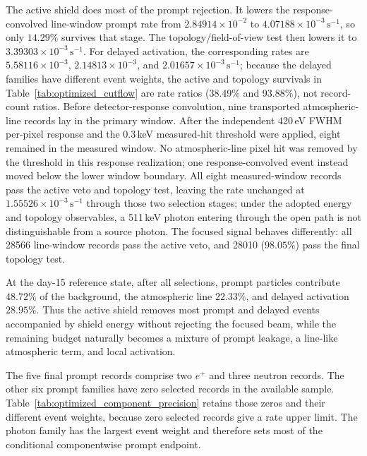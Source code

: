\documentclass[11pt]{article}
\newcommand{\cps}{\ensuremath{\,\mathrm{s^{-1}}}}
\begin{document}
The active shield does most of the prompt rejection. It lowers the response-convolved
line-window prompt rate from $2.84914\times10^{-2}$ to
$4.07188\times10^{-3}\cps$, so only $14.29\%$ survives that stage. The topology/field-of-view test then lowers
it to $3.39303\times10^{-3}\cps$. For delayed activation, the corresponding
rates are $5.58116\times10^{-3}$, $2.14813\times10^{-3}$, and
$2.01657\times10^{-3}\cps$; because the delayed families have different event
weights, the active and topology survivals in Table~\ref{tab:optimized_cutflow}
are rate ratios (38.49\% and 93.88\%), not record-count ratios. Before detector-response
convolution, nine transported atmospheric-line records lay in the primary window.
After the independent 420\,eV FWHM per-pixel response and the 0.3\,keV measured-hit
threshold were applied, eight remained in the measured window. No atmospheric-line
pixel hit was removed by the threshold in this response realization; one
response-convolved event instead moved below the lower window boundary.
All eight measured-window records pass the active veto and topology test, leaving
the rate unchanged at $1.55526\times10^{-3}\cps$ through those two selection stages;
under the adopted energy and topology observables, a 511\,keV photon entering
through the open path is not distinguishable from a source photon. The focused
signal behaves differently:
all 28566 line-window records pass the active veto, and 28010 ($98.05\%$) pass the
final topology test.

At the day-15 reference state, after all selections, prompt particles contribute
$48.72\%$ of the background, the atmospheric line $22.33\%$, and delayed
activation $28.95\%$. Thus the active
shield removes most prompt and delayed events accompanied by shield energy without
rejecting the focused beam, while the remaining budget naturally becomes a mixture
of prompt leakage, a line-like atmospheric term, and local activation.

The five final prompt records comprise two $e^+$ and three neutron records. The
other six prompt families have zero selected records in the available sample.
Table~\ref{tab:optimized_component_precision} retains those zeros and their
different event weights, because zero selected records give a rate upper limit.
The photon family has the largest event weight and therefore sets most of the
conditional componentwise prompt endpoint.
\end{document}
